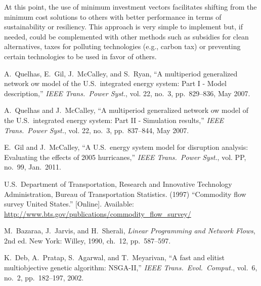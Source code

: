 \documentclass{article}
\begin{document}
At this point, the use of minimum investment vectors facilitates shifting from the minimum cost solutions to others with better performance in terms of sustainability or resiliency. This approach is very simple to implement but, if needed, could be complemented with other methods such as subsidies for clean alternatives, taxes for polluting technologies (e.g., carbon tax) or preventing certain technologies to be used in favor of others.

\begin{thebibliography}{9}

 A.~Quelhas, E.~Gil, J.~McCalley, and S.~Ryan, ``A multiperiod generalized network 
ow model of the U.S.~integrated energy system: Part I - Model description,'' \emph{IEEE Trans.~Power Syst.}, vol. 22, no.~3, pp.~829--836, May 2007.

 A.~Quelhas and J.~McCalley, ``A multiperiod generalized network 
ow model of the U.S.~integrated energy system: Part II - Simulation results,'' \emph{IEEE Trans.~Power Syst.}, vol. 22, no.~3, pp.~837--844, May 2007.

 E.~Gil and J.~McCalley, ``A U.S.~energy system model for disruption analysis: Evaluating the effects of
2005 hurricanes,''  \emph{IEEE Trans.~Power Syst.}, vol. PP, no.~99, Jan.~2011.

 U.S.~Department of Transportation, Research and Innovative Technology Administration, Bureau
of Transportation Statistics. (1997) ``Commodity flow survey United States.'' [Online]. Available: \url{http://www.bts.gov/publications/commodity_flow_survey/}

 M.~Bazaraa, J.~Jarvis, and H.~Sherali, \emph{Linear Programming and Network Flows}, 2nd ed. New York: Willey, 1990, ch.~12, pp.~587--597.

 K.~Deb, A.~Pratap, S.~Agarwal, and T.~Meyarivan, ``A fast and elitist multiobjective genetic algorithm: NSGA-II,'' \emph{IEEE Trans.~Evol.~Comput.}, vol.~6, no.~2, pp.~182--197, 2002.

\end{thebibliography}
\end{document}
